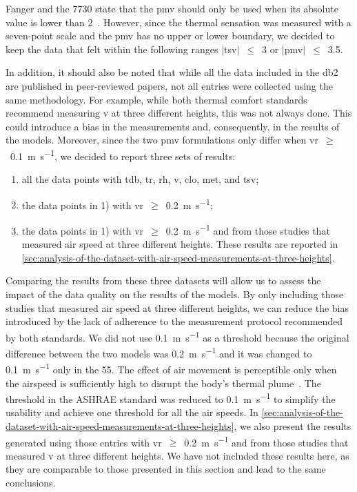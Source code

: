 Fanger and the \gls{7730} state that the \ac{pmv} should only be used when its absolute value is lower than 2~\cite{Fanger1970, iso7730}.
However, since the thermal sensation was measured with a seven-point scale and the \ac{pmv} has no upper or lower boundary, we decided to keep the data that felt within the following ranges $|$\ac{tsv}$|$~$\leq$~\num{3} or $|$\ac{pmv}$|$~$\leq$~\num{3.5}.

In addition, it should also be noted that while all the data included in the \ac{db2} are published in peer-reviewed papers, not all entries were collected using the same methodology.
For example, while both thermal comfort standards recommend measuring \ac{v} at three different heights, this was not always done.
This could introduce a bias in the measurements and, consequently, in the results of the models.
Moreover, since the two \ac{pmv} formulations only differ when \ac{vr}~$\geq$~\qty{0.1}{\m\per\s}, we decided to report three sets of results:
\begin{enumerate}[ {}1{)} ]
    \item all the data points with \ac{tdb}, \ac{tr}, \ac{rh}, \ac{v}, \ac{clo}, \ac{met}, and \ac{tsv};
    \item the data points in 1) with \ac{vr}~$\geq$~\qty{0.2}{\m\per\s};
    \item the data points in 1) with \ac{vr}~$\geq$~\qty{0.2}{\m\per\s} and from those studies that measured air speed at three different heights.
    These results are reported in \ref{sec:analysis-of-the-dataset-with-air-speed-measurements-at-three-heights}.
\end{enumerate}
Comparing the results from these three datasets will allow us to assess the impact of the data quality on the results of the models.
By only including those studies that measured air speed at three different heights, we can reduce the bias introduced by the lack of adherence to the measurement protocol recommended by both standards.
We did not use \qty{0.1}{\m\per\s} as a threshold because the original difference between the two models was \qty{0.2}{\m\per\s} and it was changed to \qty{0.1}{\m\per\s} only in the \gls{55}.
The effect of air movement is perceptible only when the airspeed is sufficiently high to disrupt the body's thermal plume~\cite{zukowska_impact_2012}.
The threshold in the ASHRAE standard was reduced to \qty{0.1}{\m\per\s} to simplify the usability and achieve one threshold for all the air speeds.
In \ref{sec:analysis-of-the-dataset-with-air-speed-measurements-at-three-heights}, we also present the results generated using those entries with \ac{vr}~$\geq$~\qty{0.2}{\m\per\s} and from those studies that measured \ac{v} at three different heights.
We have not included these results here, as they are comparable to those presented in this section and lead to the same conclusions.

